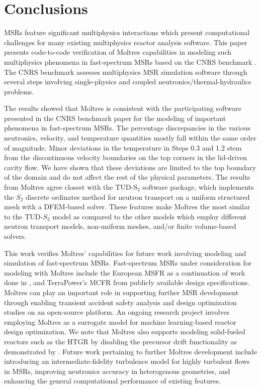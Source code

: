 \section{Conclusions}

\glspl{MSR} feature significant multiphysics interactions which present
computational challenges for many existing multiphysics reactor analysis
software. This paper presents code-to-code verification of Moltres
capabilities in modeling such multiphysics phenomena in fast-spectrum
\glspl{MSR} based on the CNRS benchmark \cite{tiberga_results_2020}.
The CNRS benchmark assesses multiphysics \gls{MSR} simulation
software through several steps involving single-physics and coupled
neutronics/thermal-hydraulics problems.

The results showed that Moltres is consistent with the participating software
presented in the CNRS benchmark paper for the modeling of important phenomena
in fast-spectrum \glspl{MSR}. The percentage discrepancies in the various
neutronics, velocity, and temperature quantities mostly fall within the same
order of magnitude. Minor deviations in the temperature in Steps 0.3 and 1.2 
stem from the discontinuous velocity
boundaries on the top corners in the lid-driven cavity flow. We have shown that
these deviations are limited to the top boundary of the domain and do not
affect the rest of the physical parameters. The results from
Moltres agree closest with the TUD-S$_2$ software package, which implements the
$S_2$ discrete ordinates method for
neutron transport on a uniform structured mesh with a \gls{DFEM}-based solver.
These features make Moltres the most similar to the TUD-$S_2$ model as compared
to the other models which employ different neutron transport models,
non-uniform meshes, and/or finite volume-based solvers. 

This work verifies Moltres' capabilities for future work involving modeling and
simulation of fast-spectrum \glspl{MSR}. Fast-spectrum \glspl{MSR}
under consideration for modeling with Moltres include the European \gls{MSFR}
as a continuation of work done in \cite{park_advancement_2020}, and
TerraPower's \gls{MCFR} \cite{terrapower_terrapower_2021} from publicly
available design specifications. Moltres can play an important role in
supporting further \gls{MSR} development through enabling transient accident
safety analysis and design optimization studies on an open-source platform.
An ongoing research project involves employing Moltres as a
surrogate model for machine learning-based reactor design optimization.
We note that Moltres also supports modeling solid-fueled reactors such as the
\gls{HTGR} by disabling the precursor drift functionality as demonstrated by
\cite{fairhurst-agosta_multi-physics_2020}. Future work pertaining to
further Moltres development include introducing an intermediate-fidelity
turbulence model for highly turbulent flows in \glspl{MSR}, improving
neutronics accuracy in heterogenous geometries, and enhancing the general
computational performance of existing features.

\FloatBarrier

